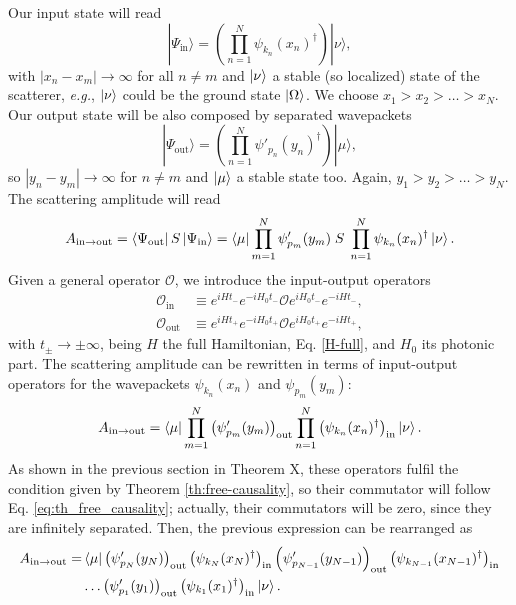 \documentclass[notitlepage, prx, preprint, amsmath,superscriptaddress,amssymb]{revtex4-1}
\begin{document}
Our input state will read
\begin{equation}
|\Psi_\text{in}\rangle = \left(\prod_{n=1}^N \psi_{k_n}(x_n)^\dagger \right)|\nu\rangle,
\end{equation}
with $|x_n-x_m|\to\infty$ for all $n\neq m$ and $\ket{\nu}$ a stable (so localized) state of the scatterer, \emph{e.g.}, $\ket{\nu}$ could be the ground state $\ket{\Omega}$. We choose $x_1>x_2>\dots >x_N$. Our output state will be also composed by separated wavepackets
\begin{equation}
|\Psi_\text{out}\rangle = \left(\prod_{n=1}^N \psi'_{p_n}(y_n)^\dagger \right)|\mu\rangle,
\end{equation}
so $|y_n-y_m|\to\infty$ for $n\neq m$ and $\ket{\mu}$ a stable state too. Again, $y_1>y_2>\dots > y_N$. The scattering amplitude will read
\begin{equation}
A_{\text{in}\to\text{out}}=\bra{\Psi_\text{out}}S\ket{\Psi_\text{in}}= \bra{\mu} \prod_{m=1}^N \psi'_{p_m}(y_m)\;S\;\prod_{n=1}^N\psi_{k_n}(x_n)^\dagger\ket{\nu}.
\end{equation}
Given a general operator $\mathcal{O}$, we introduce the input-output operators
\begin{align}
\label{eq:O_in}\mathcal{O}_\text{in} & \equiv e^{iHt_-}e^{-iH_0t_-} \mathcal{O}e^{iH_0t_-}e^{-iHt_-},\\
\label{eq:O_out}\mathcal{O}_\text{out} & \equiv e^{iHt_+}e^{-iH_0t_+} \mathcal{O}e^{iH_0t_+}e^{-iHt_+},
\end{align}
with $t_\pm \to \pm \infty$, being $H$ the full Hamiltonian, Eq. \eqref{H-full}, and $H_0$ its photonic part. The scattering amplitude can be rewritten in terms of input-output operators for the wavepackets $\psi_{k_n}(x_n)$ and $\psi_{p_m}(y_m)$:
\begin{equation}
A_{\text{in}\to\text{out}}=\bra{\mu} \prod_{m=1}^N \left(\psi'_{p_m}(y_m)\right)_\text{out}\prod_{n=1}^N\left(\psi_{k_n}(x_n)^\dagger\right)_\text{in}\ket{\nu}.
\end{equation}
{\color{red}As shown in the previous section in Theorem X}, these operators fulfil the condition given by Theorem \ref{th:free-causality}, so their commutator will follow Eq. \eqref{eq:th_free_causality}; actually, their commutators will be zero, since they are infinitely separated. Then, the previous expression can be rearranged as
\begin{align}
A_{\text{in}\to\text{out}}=& \bra{\mu} \left(\psi'_{p_N}(y_N)\right)_\text{out}\left(\psi_{k_N}(x_N)^\dagger\right)_\text{in}\left(\psi'_{p_{N-1}}(y_{N-1})\right)_\text{out}\left(\psi_{k_{N-1}}(x_{N-1})^\dagger\right)_\text{in}\nonumber\\
&\dots \left(\psi'_{p_1}(y_1)\right)_\text{out}\left(\psi_{k_1}(x_1)^\dagger\right)_\text{in}\ket{\nu}.
\end{align}
\end{document}
